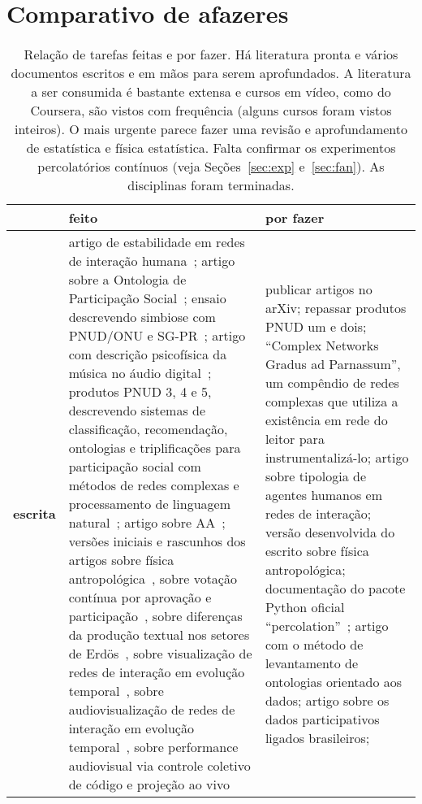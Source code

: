 \documentclass[a4paper,openright,12pt]{report} %
\begin{document}
\section{Comparativo de afazeres}\label{sec:afa}
\begin{table}[h]
\centering
\footnotesize
\caption{ \footnotesize Relação de tarefas feitas e por fazer. Há literatura pronta e vários documentos escritos e em mãos para serem aprofundados. A literatura a ser consumida é bastante extensa e cursos em vídeo, como do Coursera,
são vistos com frequência (alguns cursos foram vistos inteiros).
O mais urgente parece fazer uma revisão e aprofundamento de estatística
e física estatística. Falta confirmar os experimentos percolatórios contínuos (veja Seções~\ref{sec:exp} e~\ref{sec:fan}).
As disciplinas foram terminadas.}\label{tab:afa}
\begin{tabular}{p{1.3cm}||p{7.6cm}|p{7.1cm}}\hline
    & {\bf feito} & {\bf por fazer} \\\hline
    {\bf escrita}      & artigo de estabilidade em redes de interação humana~\cite{timeS};
    artigo sobre a Ontologia de Participação Social~\cite{ops};
    ensaio descrevendo simbiose com PNUD/ONU e SG-PR~\cite{ensaioAA};
    artigo com descrição psicofísica da música no áudio digital~\cite{massa};
    produtos PNUD 3, 4 e 5, descrevendo sistemas de classificação, recomendação, ontologias e triplificações para participação social com métodos de redes complexas e processamento de linguagem natural~\cite{pnud3,pnud4,pnud5};
    artigo sobre AA~\cite{paaper}; 
    versões iniciais e rascunhos dos artigos sobre física antropológica~\cite{pa},
    sobre votação contínua por aprovação e participação~\cite{vote},
    sobre diferenças da produção textual nos setores de Erdös~\cite{rcText},
    sobre visualização de redes de interação em evolução temporal~\cite{versinus},
    sobre audiovisualização de redes de interação em evolução temporal~\cite{versinus},
    sobre performance audiovisual via controle coletivo de código e projeção ao vivo~\cite{vivace}
    & publicar artigos no arXiv; repassar produtos PNUD um e dois;
    ``Complex Networks Gradus ad Parnassum'', um compêndio de redes complexas que utiliza a existência
    em rede do leitor para instrumentalizá-lo;
    artigo sobre tipologia de agentes humanos em redes de interação;
    versão desenvolvida do escrito sobre física antropológica;
    documentação do pacote Python oficial ``percolation''~\cite{percolation};
    artigo com o método de levantamento de ontologias orientado aos dados;
    artigo sobre os dados participativos ligados brasileiros;

\end{tabular}
\end{table}
\end{document}
